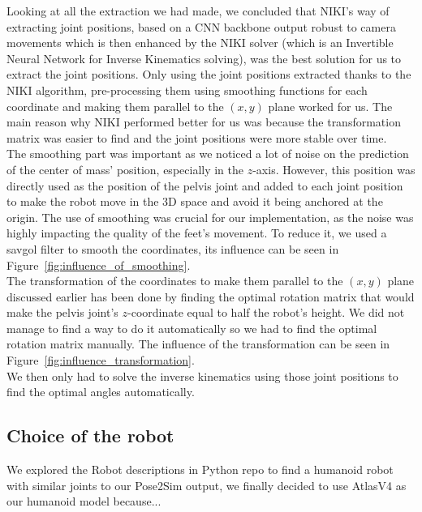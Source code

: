 \documentclass{amsart}
\theoremstyle{definition}
\theoremstyle{plain}
\begin{document}
Looking at all the extraction we had made, we concluded that NIKI's way of extracting joint positions, based on a CNN backbone output robust to camera movements which is then enhanced by the NIKI solver (which is an Invertible Neural Network for Inverse Kinematics solving), was the best solution for us to extract the joint positions. Only using the joint positions extracted thanks to the NIKI algorithm, pre-processing them using smoothing functions for each coordinate and making them parallel to the $(x, y)$ plane worked for us. The main reason why NIKI performed better for us was because the transformation matrix was easier to find and the joint positions were more stable over time.\\

The smoothing part was important as we noticed a lot of noise on the prediction of the center of mass' position, especially in the $z$-axis. However, this position was directly used as the position of the pelvis joint and added to each joint position to make the robot move in the 3D space and avoid it being anchored at the origin. The use of smoothing was crucial for our implementation, as the noise was highly impacting the quality of the feet's movement. To reduce it, we used a savgol filter to smooth the coordinates, its influence can be seen in Figure~\ref{fig:influence_of_smoothing}.\\

The transformation of the coordinates to make them parallel to the $(x, y)$ plane discussed earlier has been done by finding the optimal rotation matrix that would make the pelvis joint's $z$-coordinate equal to half the robot's height. We did not manage to find a way to do it automatically so we had to find the optimal rotation matrix manually. The influence of the transformation can be seen in Figure~\ref{fig:influence_transformation}.\\

We then only had to solve the inverse kinematics using those joint positions to find the optimal angles automatically.

\subsection{Choice of the robot}


We explored the Robot descriptions in Python repo\cite{robot_descriptions_py} to find a humanoid robot with similar joints to our Pose2Sim output, we finally decided to use AtlasV4 as our humanoid model because...
\end{document}
